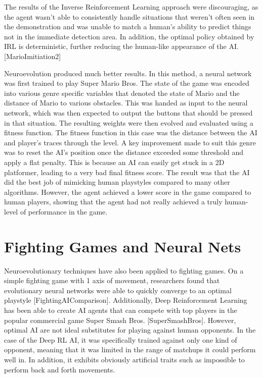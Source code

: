 The results of the Inverse Reinforcement Learning approach were discouraging, as the agent wasn't able to consistently handle situations that weren't often seen in the demonstration and was unable to match a human's ability to predict things not in the immediate detection area. In addition, the optimal policy obtained by IRL is deterministic, further reducing the human-like appearance of the AI.[MarioImitiation2]

Neuroevolution produced much better results. In this method, a neural network was first trained to play Super Mario Bros. The state of the game was encoded into various genre specific variables that denoted the state of Mario and the distance of Mario to various obstacles. This was handed as input to the neural network, which was then expected to output the buttons that should be pressed in that situation. The resulting weights were then evolved and evaluated using a fitness function. The fitness function in this case was the distance between the AI and player's traces through the level. A key improvement made to suit this genre was to reset the AI's position once the distance exceeded some threshold and apply a flat penalty. This is because an AI can easily get stuck in a 2D platformer, leading to a very bad final fitness score. The result was that the AI did the best job of mimicking human playstyles compared to many other algorithms. However, the agent achieved a lower score in the game compared to human players, showing that the agent had not really achieved a truly human-level of performance in the game.

\section{Fighting Games and Neural Nets}
Neuroevolutionary techniques have also been applied to fighting games. On a simple fighting game with 1 axis of movement, researchers found that evolutionary neural networks were able to quickly converge to an optimal playstyle [FightingAIComparison]. Additionally, Deep Reinforcement Learning has been able to create AI agents that can compete with top players in the popular commercial game Super Smash Bros. [SuperSmashBros]. However, optimal AI are not ideal substitutes for playing against human opponents. In the case of the Deep RL AI, it was specifically trained against only one kind of opponent, meaning that it was limited in the range of matchups it could perform well in. In addition, it exhibits obviously artificial traits such as impossible to perform back and forth movements.

